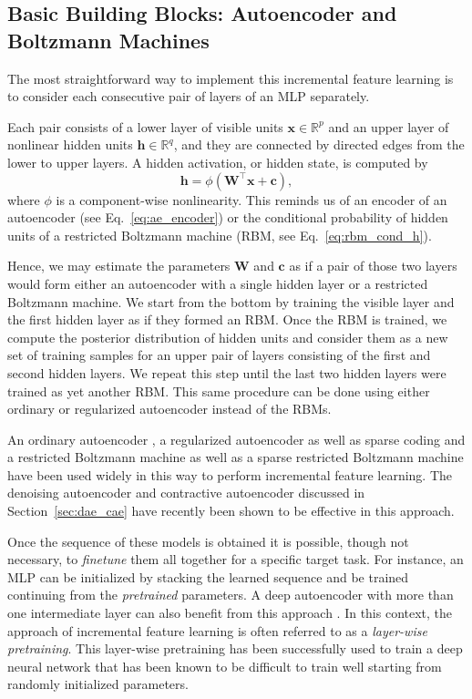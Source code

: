 \documentclass{now}
\newcommand{\vect}[1]{\mathbf{#1}}
\newcommand{\matr}[1]{\mathbf{#1}}
\newcommand{\vc}[0]{\vect{c}}
\newcommand{\vh}[0]{\vect{h}}
\newcommand{\vx}[0]{\vect{x}}
\newcommand{\mW}[0]{\matr{W}}
\newcommand{\RR}[0]{\mathbb{R}}
\begin{document}
\subsection{Basic Building Blocks: Autoencoder and Boltzmann
Machines}
\label{sec:basic_blocks1}

The most straightforward way to implement this incremental
feature learning is to consider each consecutive pair of
layers of an MLP separately. 

Each pair consists of a lower layer of visible units $\vx
\in \RR^p$ and an upper layer of nonlinear hidden units $\vh
\in \RR^q$, and they are connected by directed edges from
the lower to upper layers. A hidden activation, or hidden
state, is computed by 
\[
\vh = \phi\left( \mW^\top \vx + \vc \right),
\]
where $\phi$ is a component-wise nonlinearity.  This reminds
us of an encoder of an autoencoder (see
Eq.~\eqref{eq:ae_encoder}) or the conditional probability of
hidden units of a restricted Boltzmann machine (RBM, see
Eq.~\eqref{eq:rbm_cond_h}).

Hence, 
we may estimate the parameters $\mW$ and
$\vc$ as if a pair of those two layers would form either an
autoencoder with a single hidden layer or a restricted
Boltzmann machine. We start from the bottom by training the
visible layer and the first hidden layer as if they formed
an RBM. Once the RBM is trained, we compute the posterior
distribution of hidden units and consider them as a new set
of training samples for an upper pair of layers consisting
of the first and second hidden layers. We repeat this step
until the last two hidden layers were trained as yet
another RBM. This same procedure can be done using
either ordinary or regularized autoencoder instead of the
RBMs.

An ordinary autoencoder \citep[see, e.g.,][and
Section~\ref{sec:autoencoders}]{Bengio2007nips}, a
regularized autoencoder \citep[see, e.g.,][and
Section~\ref{sec:spaenc}]{Ranzato2008} as
well as sparse coding \citep[see, e.g.,][and
Section~\ref{sec:sparse_coding}]{Raina2007} and a restricted
Boltzmann machine \citep[see, e.g.,][and
Section~\ref{sec:rbm}]{Hinton2006} as well as a sparse
restricted Boltzmann machine \citep[see, e.g.,][]{Lee2007}
have been used widely in this way to perform incremental
feature learning. The denoising autoencoder
\citep{Vincent2010} and contractive autoencoder
\citep{Rifai2011} discussed in Section~\ref{sec:dae_cae}
have recently been shown to be effective in this approach.

Once the sequence of these models is obtained it is
possible, though not necessary, to \textit{finetune} them
all together for a specific target task. For instance, an
MLP can be initialized by stacking the learned sequence and
be trained continuing from the \textit{pretrained}
parameters.
A deep autoencoder with more
than one intermediate layer can also benefit from this
approach \citep{Hinton2006}. In this context, the approach
of incremental feature learning is often referred to as a
\textit{layer-wise pretraining}. This layer-wise pretraining
has been successfully used to train a deep neural network
that has been known to be difficult to train well
starting from randomly initialized parameters.
\end{document}
